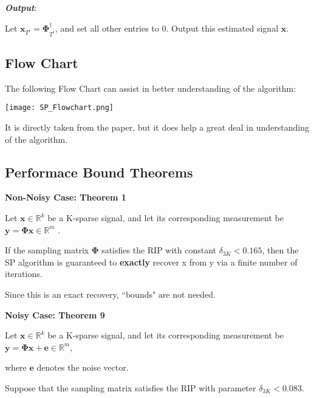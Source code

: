 \documentclass[fleqn, 11pt]{article}
\newcommand{\bs}[1]{\boldsymbol{#1}}
\newcommand{\R}[0]{\mathbb{R}}
\begin{document}
\textbf{\textit{Output}}:

Let $\bs{x}_{T^i} = \bs{\Phi}^{\dagger}_{T^i}  $, and set all other entries to 0. Output this estimated signal $\bs{x}$.

\hrulefill

\subsection*{Flow Chart}

The following Flow Chart can assist in better understanding of the algorithm: 

\texttt{[image: SP\_Flowchart.png]}

It is directly taken from the paper, but it does help a great deal in  understanding of the algorithm.

\newpage

\subsection*{Performace Bound Theorems }

\medskip

\textbf{Non-Noisy Case: Theorem 1 }

\smallskip

Let $\bs{x} \in \R^k$ be a K-sparse signal, and let
its corresponding measurement be $\bs{y = \Phi x} \in \R^m$ .

\smallskip

If the sampling matrix $\bs{\Phi}$  satisfies the RIP with constant  $\delta_{3K} < 0.165$, then the SP algorithm is guaranteed to \textbf{exactly} recover x from
y via a finite number of iterations.

\smallskip


Since this is an exact recovery, ``bounds" are not needed. 


\hrulefill

\medskip

\textbf{Noisy Case: Theorem 9 }

\smallskip

Let $\bs{x} \in \R^k$ be a K-sparse signal, and let
its corresponding measurement be $\bs{y = \Phi x + e}  \in \R^m$, 

where $\bs{e}$  denotes the noise vector. 

\smallskip

Suppose that the sampling matrix satisfies
the RIP with parameter $\delta_{3K} < 0.083 $.  

\smallskip
\end{document}
